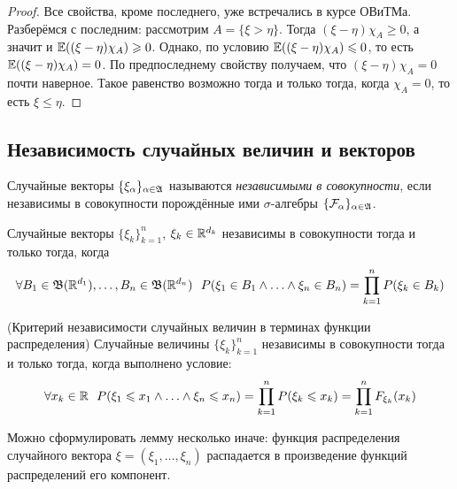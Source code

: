 \begin{proof}
	Все свойства, кроме последнего, уже встречались в курсе ОВиТМа. Разберёмся с последним: рассмотрим $A = \{\xi > \eta\}$. Тогда $(\xi - \eta)\chi_A \ge 0$, а значит и $\mathbb{E}((\xi - \eta)\chi_A) \geqslant 0$. Однако, по условию $\mathbb{E}((\xi - \eta)\chi_A) \leqslant 0$, то есть $\mathbb{E}((\xi - \eta)\chi_A) = 0$. По предпоследнему свойству получаем, что $(\xi - \eta)\chi_A = 0$ почти наверное. Такое равенство возможно тогда и только тогда, когда $\chi_A = 0$, то есть $\xi \le \eta$.
\end{proof}

\subsection{Независимость случайных величин и векторов}

\begin{definition}
	Случайные векторы $\{\xi_\alpha\}_{\alpha \in \mathfrak{A}}$ называются \textit{независимыми в совокупности}, если независимы в совокупности порождённые ими $\sigma$-алгебры $\{\mathcal{F}_\alpha\}_{\alpha \in \mathfrak{A}}$.
\end{definition}

\begin{corollary}
	Случайные векторы $\{\xi_k\}_{k = 1}^n$, $\xi_k \in \mathbb{R}^{d_k}$ независимы в совокупности тогда и только тогда, когда
	\[
		\forall B_1 \in \mathfrak{B}(\mathbb{R}^{d_1}), \ldots, B_n \in \mathfrak{B}(\mathbb{R}^{d_n})\ \ P(\xi_1 \in B_1 \wedge \ldots \wedge \xi_n \in B_n) = \prod_{k = 1}^n P(\xi_k \in B_k)
	\]
\end{corollary}

\begin{lemma} (Критерий независимости случайных величин в терминах функции распределения)
	Случайные величины $\{\xi_k\}_{k = 1}^n$ независимы в совокупности тогда и только тогда, когда выполнено условие:
	\[
		\forall x_k \in \mathbb{R}\ \ P(\xi_1 \leqslant x_1 \wedge \ldots \wedge \xi_n \leqslant x_n) = \prod_{k = 1}^n P(\xi_k \leqslant x_k) = \prod_{k = 1}^n F_{\xi_k}(x_k)
	\]
\end{lemma}

\begin{note}
	Можно сформулировать лемму несколько иначе: функция распределения случайного вектора $\xi = (\xi_1, \ldots, \xi_n)$ распадается в произведение функций распределений его компонент.
\end{note}

